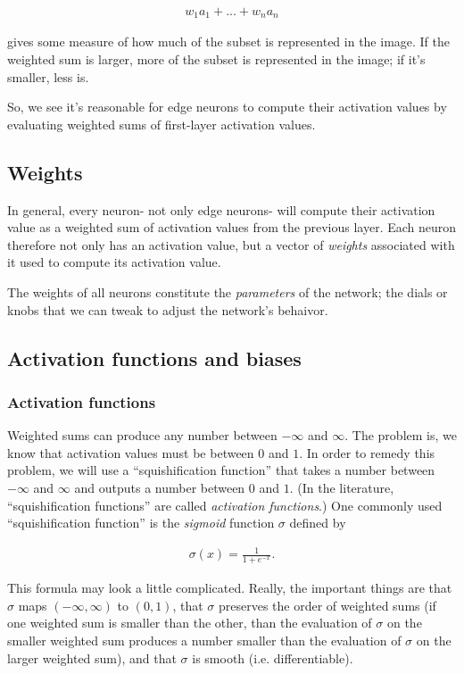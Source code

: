 \documentclass{article}
\begin{document}
	\begin{align*}
		w_1 a_1 + ... + w_n a_n
	\end{align*}
	
	gives some measure of how much of the subset is represented in the image. If the weighted sum is larger, more of the subset is represented in the image; if it's smaller, less is.
	
	So, we see it's reasonable for edge neurons to compute their activation values by evaluating weighted sums of first-layer activation values.
	
	\subsection*{Weights}
	
	In general, every neuron- not only edge neurons- will compute their activation value as a weighted sum of activation values from the previous layer. Each neuron therefore not only has an activation value, but a vector of \textit{weights} associated with it used to compute its activation value.
	
	The weights of all neurons constitute the  \textit{parameters} of the network; the dials or knobs that we can tweak to adjust the network's behaivor.
	
	\subsection*{Activation functions and biases}
	
	\subsubsection*{Activation functions}
	
	Weighted sums can produce any number between $-\infty$ and $\infty$. The problem is, we know that activation values must be between $0$ and $1$. In order to remedy this problem, we will use a ``squishification function'' that takes a number between $-\infty$ and $\infty$ and outputs a number between $0$ and $1$. (In the literature, ``squishification functions'' are called \textit{activation functions}.) One commonly used ``squishification function'' is the \textit{sigmoid} function $\sigma$ defined by
	
	\begin{align*}
		\sigma(x) = \frac{1}{1 + e^{-x}}.
	\end{align*}
	
	This formula may look a little complicated. Really, the important things are that $\sigma$ maps $(-\infty, \infty)$ to $(0, 1)$, that $\sigma$ preserves the order of weighted sums (if one weighted sum is smaller than the other, than the evaluation of $\sigma$ on the smaller weighted sum produces a number smaller than the evaluation of $\sigma$ on the larger weighted sum), and that $\sigma$ is smooth (i.e. differentiable).
	
\end{document}
